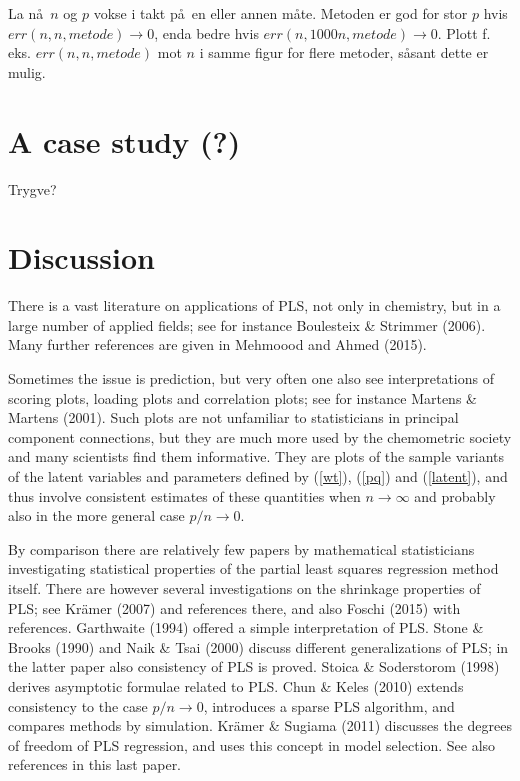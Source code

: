 \documentclass[11pt]{article}
\begin{document}
La n\aa\ $n$ og $p$ vokse i takt p\aa\ en eller annen m\aa te. Metoden er god for stor $p$ hvis $err(n,n,metode)\rightarrow 0$, enda bedre hvis $err(n, 1000n, metode)\rightarrow 0$. Plott f. eks.  $err(n,n, metode)$ mot $n$ i samme figur for flere metoder, s\aa sant dette er mulig.

\section{A case study (?)}

Trygve?

\section{Discussion}

There is a vast literature on applications of PLS, not only in chemistry, but in a large number of applied fields; see for instance Boulesteix \& Strimmer (2006). Many further references are given in \citet{mehmood2016diversity} Mehmoood and Ahmed (2015).

Sometimes the issue is prediction, but very often one also see interpretations of scoring plots, loading plots and correlation plots; see for instance Martens \& Martens (2001). Such plots are not unfamiliar to statisticians in principal component connections, but they are much more used by the chemometric society and many scientists find them informative. They are plots of the sample variants of the latent variables and parameters defined by (\ref{wt}), (\ref{pq}) and (\ref{latent}), and thus involve consistent estimates of these quantities when $n\rightarrow\infty$ and probably also in the more general case $p/n\rightarrow 0$.

By comparison there are relatively few papers by mathematical statisticians investigating statistical properties of the partial least squares regression method itself. There are however several investigations on the shrinkage properties of PLS; see Kr\"{a}mer (2007) and references there, and also Foschi (2015) with references. Garthwaite (1994) offered a simple interpretation of PLS. Stone \& Brooks (1990) and Naik \& Tsai (2000)  discuss different generalizations of PLS; in the latter paper also consistency of PLS is proved. Stoica \& Soderstorom (1998) derives asymptotic formulae related to PLS. Chun \& Keles (2010) extends consistency to the case $p/n\rightarrow 0$, introduces a sparse PLS algorithm, and compares methods by simulation.  Kr\"{a}mer \& Sugiama (2011) discusses the degrees of freedom of PLS regression, and uses this concept in model selection. See also references in this last paper.
\end{document}
